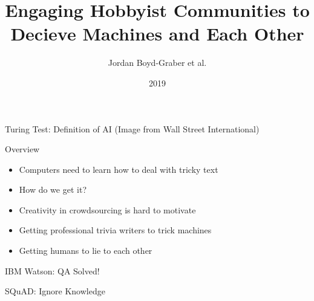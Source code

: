 \documentclass[xcolor=dvipsnames]{beamer}
\title[Trick me if you can]{Engaging Hobbyist Communities to Decieve Machines and Each Other}
\author{ Jordan Boyd-Graber et al.}
\date{2019}
\institute[Maryland] %
{University of Maryland}
\newcommand{\fsi}[2]{
\begin{frame}[plain]
\vspace*{-1pt}
\makebox[\linewidth]{\texttt{[image: \#1]}}
\begin{center}
#2
\end{center}
\end{frame}
}
\begin{document}
\frame{
\titlepage
\tiny
}

\fsi{qb/turing}{Turing Test: Definition of AI (Image from Wall Street
  International)}

\begin{frame}{Overview}

\begin{itemize}
  \item Computers need to learn how to deal with tricky text
  \item How do we get it?
  \item Creativity in crowdsourcing is hard to motivate
  \item Getting professional trivia writers to trick machines
  \item Getting humans to lie to each other
\end{itemize}

\end{frame}

\fsi{qb/jeopardy}{IBM Watson: QA Solved!}

\fsi{qb/human_reading}{SQuAD: Ignore Knowledge}
\end{document}
